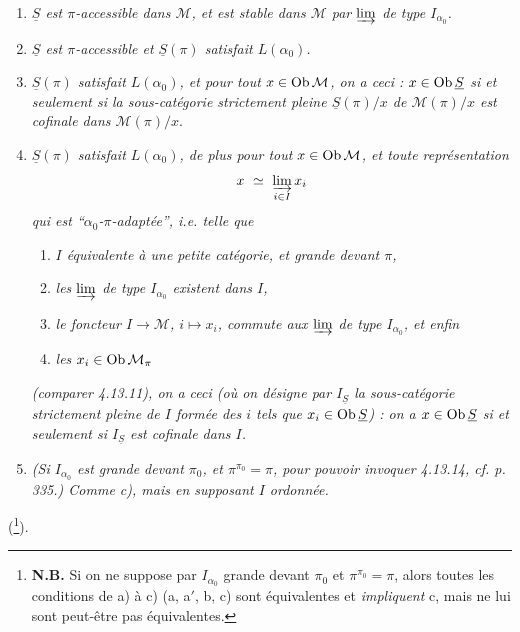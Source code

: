 \begin{enumerate}[label={}]
\item[\textit{a)}] \textit{$\underline{S}$ est $\pi$-accessible dans $\mathcal{M}$, et est stable dans $\mathcal{M}$ par $\varinjlim$ de type $I_{\alpha_0}$.}
\item[\textit{a$'$)}] \textit{$\underline{S}$ est $\pi$-accessible et $\underline{S}(\pi)$ satisfait $L(\alpha_0)$.}
\item[\textit{b)}] \textit{$\underline{S}(\pi)$ satisfait $L(\alpha_0)$, et pour tout $x \in \operatorname{Ob}\mathcal{M}$, on a ceci : $x \in \operatorname{Ob}\underline{S}$ si et seulement si la sous-catégorie strictement pleine $\underline{S}(\pi)/x$ de $\mathcal{M}(\pi)/x$ est cofinale dans $\mathcal{M}(\pi)/x$}.
\item[\textit{c)}] \textit{$\underline{S}(\pi)$ satisfait $L(\alpha_0)$, de plus pour tout $x \in \operatorname{Ob}\mathcal{M}$, et toute représentation}
\[
x \ \simeq \ \varinjlim_{i\in I} x_i
\]
\textit{qui est ``$\alpha_0$-$\pi$-adaptée'', i.e. telle que}
\begin{enumerate}[label={}]
\item[\textit{$1^\circ$)}] \textit{$I$ équivalente à une petite catégorie, et grande devant $\pi$,}
\item[\textit{$2^\circ$)}] \textit{les $\varinjlim$ de type $I_{\alpha_0}$ existent dans $I$,}
\item[\textit{$3^\circ$)}] \textit{le foncteur $I \longrightarrow \mathcal{M}$, $i \longmapsto x_i$, commute aux $\varinjlim$ de type $I_{\alpha_0}$, et enfin}
\item[\textit{$4^\circ$)}] \textit{les $x_i \in \operatorname{Ob}\mathcal{M}_\pi$}
\end{enumerate}
\textit{(comparer 4.13.11), on a ceci (où on désigne par $I_{\underline{S}}$ la sous-catégorie strictement pleine de $I$ formée des $i$ tels que $x_i \in \operatorname{Ob}\underline{S}$) : on a $x \in \operatorname{Ob}\underline{S}$ si et seulement si $I_{\underline{S}}$ est cofinale dans $I$.}
\item[\textit{c$'$)}] \textit{(\textup{Si} $I_{\alpha_0}$ est grande devant $\pi_0$, et $\pi^{\pi_0} = \pi$, pour pouvoir invoquer 4.13.14, cf. p. 335.) Comme c), mais en supposant $I$ ordonnée.}
\end{enumerate}
(\footnote[143]{\textbf{N.B.} Si on ne suppose par $I_{\alpha_0}$ grande devant $\pi_0$ et %
$\pi^{\pi_0} = \pi$, alors toutes les conditions de a) à c) (a, a$'$, b, c) sont équivalentes et \textit{impliquent} c, mais ne lui sont peut-être pas équivalentes.}).

